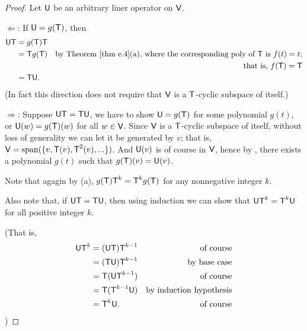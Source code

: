 \begin{proof}
Let \(\textsf{U}\) be an arbitrary liner operator on \(\textsf{V}\).

\(\Longleftarrow\):
If \(\textsf{U} = g(\textsf{T})\), then
\begin{align*}
    \U \T & = g(\T) \T \\
          & = \T g(\T) & \text{by \THM{e.4}(a), where the corresponding poly of \(\T\) is \(f(t) = t\);} \\
          &            & \text{that is, \(f(\T) = \T\)} \\
          & = \T \U.
\end{align*}
(In fact this direction does not require that \(\textsf{V}\) is a \(\textsf{T}\)-cyclic subspace of itself.)

\(\Longrightarrow\):
Suppose \(\textsf{U}\textsf{T} = \textsf{T}\textsf{U}\), we have to show \(\textsf{U} = g(\textsf{T})\) for some polynomial \(g(t)\), or \(\textsf{U}(w) = g(\textsf{T})(w)\) for all \(w \in \textsf{V}\).
Since \(\textsf{V}\) is a \(\textsf{T}\)-cyclic subspace of itself, without loss of generality we can let it be generated by \(v\);
that is, \(\textsf{V} = \operatorname{span}(\{ v, \textsf{T}(v), \textsf{T}^2(v), ... \})\).  \quad \quad
And \(\textsf{U}(v)\) is of course in \(\textsf{V}\), hence by , there exists a polynomial \(g(t)\) such that \(g(\textsf{T})(v) = \textsf{U}(v)\). 

Note that agagin by (a), \(g(\textsf{T}) \textsf{T}^k = \textsf{T}^k g(\textsf{T})\) for any nonnegative integer \(k\). 

Also note that, if \(\textsf{U}\textsf{T} = \textsf{T}\textsf{U}\), then using induction we can show that \(\textsf{U}\textsf{T}^k = \textsf{T}^k\textsf{U}\) for all positive integer \(k\). 

(That is,
\begin{align*}
    \textsf{U}\textsf{T}^k & = (\textsf{U} \textsf{T}) \textsf{T}^{k - 1} & \text{of course} \\
           & = (\textsf{T} \textsf{U}) \textsf{T}^{k - 1} & \text{by base case} \\
           & = \textsf{T} (\textsf{U} \textsf{T}^{k - 1}) & \text{of course} \\
           & = \textsf{T} (\textsf{T}^{k - 1} \textsf{U}) & \text{by induction hypothesis} \\
           & = \textsf{T}^k \textsf{U}.           & \text{of course}
\end{align*})


\end{proof}

